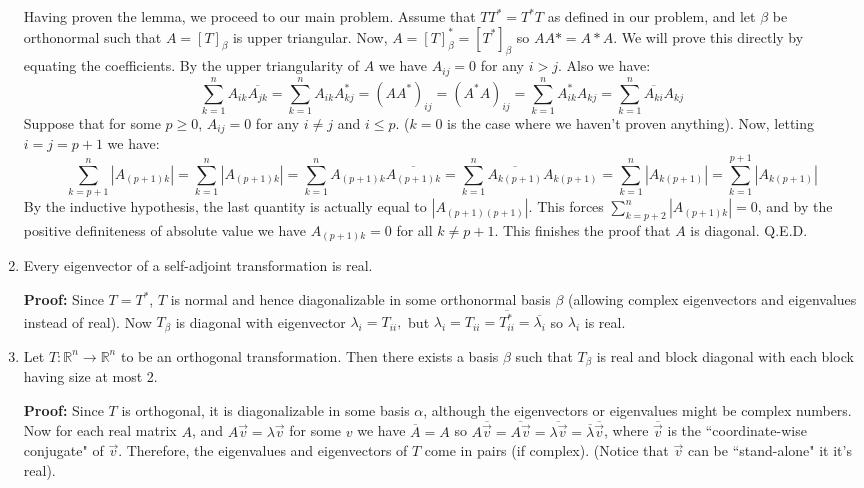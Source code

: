 \documentclass[11pt]{article}
\newcommand{\bbR}{\mathbb R}
\newcommand{\ol}{\overline}
\begin{document}
\begin{enumerate}
Having proven the lemma, we proceed to our main problem. Assume that $TT^*=T^*T$ as defined in our problem, and let $\beta$ be orthonormal such that $A=[T]_\beta$ is upper triangular. 
Now, $A=[T]_\beta^*=[T^*]_\beta$ so $AA*=A*A$. 
We will prove this directly by equating the coefficients. 
By the upper triangularity of $A$ we have $A_{ij}=0$ for any $i>j$. Also we have: 
\[\displaystyle\sum_{k=1}^n A_{ik}\ol{A_{jk}}=\displaystyle\sum_{k=1}^n A_{ik}A^*_{kj}=(AA^*)_{ij}=(A^*A)_{ij}=\displaystyle\sum_{k=1}^n A^*_{ik}A_{kj}=\displaystyle\sum_{k=1}^n\ol{A_{ki}}A_{kj}\]
Suppose that for some $p\ge 0$, $A_{ij}=0$ for any $i\neq j$ and $i\le p$. ($k=0$ is the case where we haven't proven anything). 
Now, letting $i=j=p+1$ we have:
\[\displaystyle\sum_{k=p+1}^n |A_{(p+1)k}|=\displaystyle\sum_{k=1}^n |A_{(p+1)k}|=\displaystyle\sum_{k=1}^n A_{(p+1)k}\ol{A_{(p+1)k}}=\displaystyle\sum_{k=1}^n\ol{A_{k(p+1)}}A_{k(p+1)}
=\displaystyle\sum_{k=1}^n|A_{k(p+1)}|=\displaystyle\sum_{k=1}^{p+1}|A_{k(p+1)}|\]
By the inductive hypothesis, the last quantity is actually equal to $|A_{(p+1)(p+1)}|$. 
This forces $\displaystyle\sum_{k=p+2}^n |A_{(p+1)k}|=0$, and by the positive definiteness of absolute value we have 
$A_{(p+1)k}=0$ for all $k\neq p+1$. 
This finishes the proof that $A$ is diagonal. Q.E.D. 

\item Every eigenvector of a self-adjoint transformation is real. 

\textbf{Proof:} Since $T=T^*$, $T$ is normal and hence diagonalizable in some orthonormal basis $\beta$ (allowing complex eigenvectors and eigenvalues instead of real). 
Now $T_\beta$ is diagonal with eigenvector $\lambda_i=T_{ii}, $
but $\lambda_i=T_{ii}=\ol{T^*_{ii}}=\ol{\lambda_i}$ so $\lambda_i$ is real. 

\item Let $T:\bbR^n\to \bbR^n$ to be an orthogonal transformation. Then there exists a basis $\beta$ such that $T_\beta$ is real and block diagonal with each block having size at most 2. 

\textbf{Proof: }
Since $T$ is orthogonal, it is diagonalizable in some basis $\alpha$, although the eigenvectors or eigenvalues might be complex numbers. 
Now for each real matrix $A$, and $A\vec{v}=\lambda\vec{v}$ for some $v$ we have 
$\ol{A}=A$ so $A\ol{\vec{v}}=\ol{A\vec{v}}=\ol{\lambda{\vec{v}}}=\ol{\lambda}\ol{\vec{v}}$, 
where $\ol{\vec{v}}$ is the ``coordinate-wise conjugate" of $\vec{v}$. 
Therefore, the eigenvalues and eigenvectors of $T$ come in pairs (if complex). 
(Notice that $\vec{v}$ can be ``stand-alone" it it's real). 


\end{enumerate}
\end{document}
